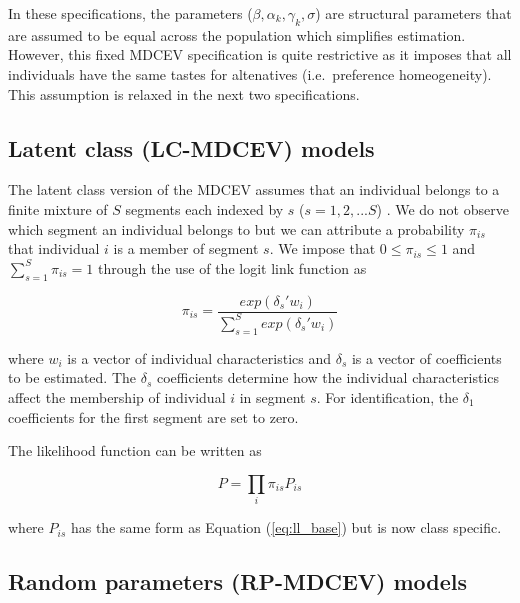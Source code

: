 In these specifications, the parameters
(\(\beta, \alpha_k , \gamma_k, \sigma\)) are structural parameters that
are assumed to be equal across the population which simplifies
estimation. However, this fixed MDCEV specification is quite restrictive
as it imposes that all individuals have the same tastes for altenatives
(i.e.~preference homeogeneity). This assumption is relaxed in the next
two specifications.

\hypertarget{latent-class-lc-mdcev-models}{%
\subsection{Latent class (LC-MDCEV)
models}\label{latent-class-lc-mdcev-models}}

The latent class version of the MDCEV assumes that an individual belongs
to a finite mixture of \(S\) segments each indexed by \(s\)
(\(s=1,2,...S\)) \citep{sobhanilatent2013, kuriyamalatent2010}. We do
not observe which segment an individual belongs to but we can attribute
a probability \(\pi_{is}\) that individual \(i\) is a member of segment
\(s\). We impose that \(0 \leq \pi_{is} \leq 1\) and
\(\sum^S_{s=1} \pi_{is} = 1\) through the use of the logit link function
as

\begin{equation}
\pi_{is} = \frac{exp(\delta_s'w_i)}{\sum^S_{s=1}exp(\delta_s'w_i)}
\end{equation}

\noindent where \(w_i\) is a vector of individual characteristics and
\(\delta_s\) is a vector of coefficients to be estimated. The
\(\delta_s\) coefficients determine how the individual characteristics
affect the membership of individual \(i\) in segment \(s\). For
identification, the \(\delta_1\) coefficients for the first segment are
set to zero.

The likelihood function can be written as

\begin{equation}
P = \prod_{i} \pi_{is}P_{is}
\end{equation}

where \(P_{is}\) has the same form as Equation (\ref{eq:ll_base}) but is
now class specific.

\hypertarget{random-parameters-rp-mdcev-models}{%
\subsection{Random parameters (RP-MDCEV)
models}\label{random-parameters-rp-mdcev-models}}


